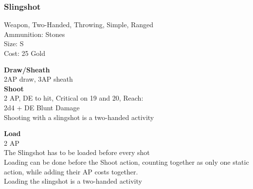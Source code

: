 \subsubsection{Slingshot}\label{weapon:slingshot}
Weapon, Two-Handed, Throwing, Simple, Ranged\\
Ammunition: Stones\\
Size: S\\
Cost: 25 Gold

\textbf{Draw/Sheath}\\
2AP draw, 3AP sheath\\

\textbf{Shoot}\\
2 AP, DE to hit, Critical on 19 and 20,  Reach:\\
2d4 + \texttimes DE Blunt Damage\\
Shooting with a slingshot is a two-handed activity

\textbf{Load}\\
2 AP\\
The Slingshot has to be loaded before every shot\\
Loading can be done before the Shoot action, counting together as only one static action, while adding their AP costs together.\\
Loading the slingshot is a two-handed activity
